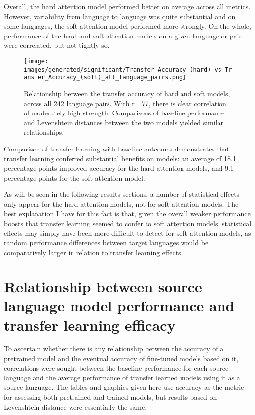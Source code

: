 Overall, the hard attention model performed better on average across all metrics. However, variability from language to language was quite substantial and on some languages, the soft attention model performed more strongly. On the whole, performance of the hard and soft attention models on a given language or pair were correlated, but not tightly so.

\begin{figure}[ht]
\texttt{[image: images/generated/significant/Transfer\_Accuracy\_(hard)\_vs\_Transfer\_Accuracy\_(soft)\_all\_language\_pairs.png]}
\centering
\caption{Relationship between the transfer accuracy of hard and soft models, across all 242 language pairs. With r=.77, there is clear correlation of moderately high strength. Comparisons of baseline performance and Levenshtein distances between the two models yielded similar relationships.}
\end{figure}

Comparison of transfer learning with baseline outcomes demonstrates that transfer learning conferred substantial benefits on models: an average of 18.1 percentage points improved accuracy for the hard attention models, and 9.1 percentage points for the soft attention model.

As will be seen in the following results sections, a number of statistical effects only appear for the hard attention models, not for soft attention models. The best explanation I have for this fact is that, given the overall weaker performance boosts that transfer learning seemed to confer to soft attention models, statistical effects may simply have been more difficult to detect for soft attention models, as random performance differences between target languages would be comparatively larger in relation to transfer learning effects.

\section{Relationship between source language model performance and transfer learning efficacy}

To ascertain whether there is any relationship between the accuracy of a pretrained model and the eventual accuracy of fine-tuned models based on it, correlations were sought between the baseline performance for each source language and the average performance of transfer learned models using it as a source language. The tables and graphics given here use accuracy as the metric for assessing both pretrained and trained models, but results based on Levenshtein distance were essentially the same.

